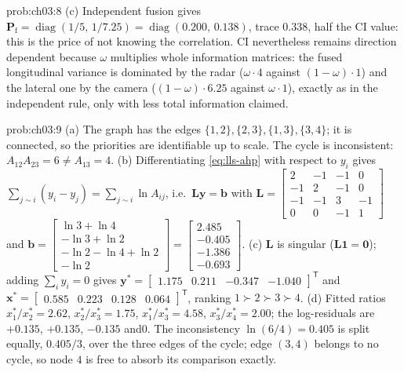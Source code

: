 \documentclass[graybox,envcountchap]{style/SNmono}
\DeclareMathOperator{\diag}{diag}
\providecommand{\DIFaddbegin}{} %
\providecommand{\DIFaddend}{} %
\begin{document}
\begin{sol}{prob:ch03:8}
(c) Independent fusion gives $\mathbf{P}_{\mathrm{f}}=\diag(1/5,\,1/7.25)=\diag(0.200,\,0.138)$, trace $0.338$, half the CI value: this is the price of not knowing the correlation. CI nevertheless remains direction dependent because $\omega$ multiplies whole information matrices: the fused longitudinal variance is dominated by the radar ($\omega\cdot4$ against $(1-\omega)\cdot1$) and the lateral one by the camera ($(1-\omega)\cdot6.25$ against $\omega\cdot1$), exactly as in the independent rule, only with less total information claimed.
\end{sol}

\begin{sol}{prob:ch03:9}
(a) The graph has the edges $\{1,2\},\{2,3\},\{1,3\},\{3,4\}$; it is connected, so the priorities are identifiable up to scale. The cycle is inconsistent: $A_{12}A_{23}=6\neq A_{13}=4$.
(b) Differentiating \eqref{eq:lls-ahp} with respect to $y_i$ gives $\sum_{j\sim i}(y_i-y_j)=\sum_{j\sim i}\ln A_{ij}$, i.e.\ $\mathbf{L}\bm{y}=\bm{b}$ with
$\mathbf{L}=\begin{bmatrix}2&-1&-1&0\\-1&2&-1&0\\-1&-1&3&-1\\0&0&-1&1\end{bmatrix}$ and
$\bm{b}=\begin{bmatrix}\ln3+\ln4\\ -\ln3+\ln2\\ -\ln2-\ln4+\ln2\\ -\ln2\end{bmatrix}=\begin{bmatrix}2.485\\-0.405\\-1.386\\-0.693\end{bmatrix}$.
(c) $\mathbf{L}$ is singular ($\mathbf{L}\mathbf{1}=\mathbf{0}$); adding $\sum_iy_i=0$ gives $\bm{y}^{*}=\begin{bmatrix}1.175&0.211&-0.347&-1.040\end{bmatrix}^{\mathsf T}$ and\DIFaddbegin \allowbreak \DIFaddend $\bm{x}^{*}=\begin{bmatrix}0.585&0.223&0.128&0.064\end{bmatrix}^{\mathsf T}$, ranking $1\succ2\succ3\succ4$.
(d) Fitted ratios $x_1^{*}/x_2^{*}=2.62$, $x_2^{*}/x_3^{*}=1.75$, $x_1^{*}/x_3^{*}=4.58$, $x_3^{*}/x_4^{*}=2.00$; the log-residuals are $+0.135$, $+0.135$, $-0.135$ and\DIFaddbegin \allowbreak \DIFaddend $0$. The inconsistency $\ln(6/4)=0.405$ is split equally, $0.405/3$, over the three edges of the cycle; edge $(3,4)$ belongs to no cycle, so node $4$ is free to absorb its comparison exactly.

\end{sol}
\end{document}
